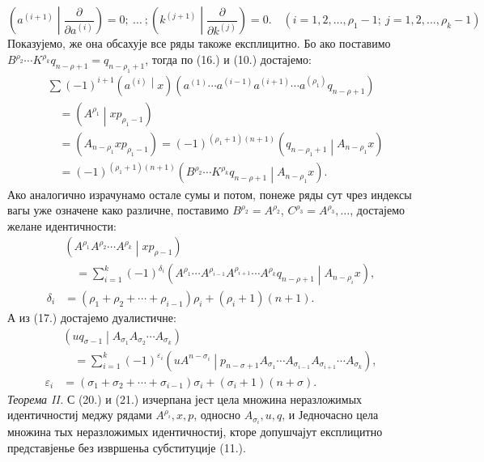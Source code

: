﻿\documentclass[11pt]{article}
\newcommand{\pair}[2]{\left(#1\middle|#2\right)}
\newcommand{\eps}{\varepsilon}
\begin{document}
\begin{equation}
 \left(a^{(i+1)}\middle|\frac{\partial}{\partial a^{(i)}}\right)=0;\ \ldots\ ;
 \left(k^{(j+1)}\middle|\frac{\partial}{\partial k^{(j)}}\right)=0.
 \quad (i=1,2,\ldots,\rho_1-1;\ j=1,2,\ldots,\rho_k-1)
\tag{19}
\end{equation}
Показујемо, же она обсахује все ряды такоже експлицитно. Бо ако поставимо $B^{\rho_2}\cdots K^{\rho_k}q_{n-\rho+1}=q_{n-\rho_1+1}$, тогда по (16.) и (10.) достајемо:
\[
\begin{aligned}
&\sum(-1)^{i+1}\pair{a^{(i)}}{x}
(a^{(1)}\cdots a^{(i-1)}a^{(i+1)}\cdots a^{(\rho_1)}q_{n-\rho+1})\\
&\quad=\pair{A^{\rho_1}}{xp_{\rho_1-1}}\\
&\quad=(A_{n-\rho_1}xp_{\rho_1-1})
=(-1)^{(\rho_1+1)(n+1)}\pair{q_{n-\rho_1+1}}{A_{n-\rho_1}x}\\
&\quad=(-1)^{(\rho_1+1)(n+1)}
\pair{B^{\rho_2}\cdots K^{\rho_k}q_{n-\rho+1}}{A_{n-\rho_1}x}.
\end{aligned}
\]
Ако аналогично израчунамо остале сумы и потом, понеже ряды сут чрез индексы вагы уже означене како различне, поставимо $B^{\rho_2}=A^{\rho_2}$, $C^{\rho_3}=A^{\rho_3},\ldots$, достајемо желане идентичности:
\begin{equation}
\begin{aligned}
&\pair{A^{\rho_1}A^{\rho_2}\cdots A^{\rho_k}}{xp_{\rho-1}}\\
&\quad=\sum_{i=1}^{k}(-1)^{\delta_i}
\pair{A^{\rho_1}\cdots A^{\rho_{i-1}}A^{\rho_{i+1}}\cdots A^{\rho_k}q_{n-\rho+1}}{A_{n-\rho_i}x},\\
\delta_i&=(\rho_1+\rho_2+\cdots+\rho_{i-1})\rho_i+(\rho_i+1)(n+1).
\end{aligned}
\tag{20}
\end{equation}
А из (17.) достајемо дуалистичне:
\begin{equation}
\begin{aligned}
&\pair{u q_{\sigma-1}}{A_{\sigma_1}A_{\sigma_2}\cdots A_{\sigma_k}}\\
&\quad=\sum_{i=1}^{k}(-1)^{\eps_i}
\pair{u A^{n-\sigma_i}}{p_{n-\sigma+1}A_{\sigma_1}\cdots A_{\sigma_{i-1}}A_{\sigma_{i+1}}\cdots A_{\sigma_k}},\\
\eps_i&=(\sigma_1+\sigma_2+\cdots+\sigma_{i-1})\sigma_i+(\sigma_i+1)(n+\sigma).
\end{aligned}
\tag{21}
\end{equation}
\emph{Теорема II.} С (20.) и (21.) изчерпана јест цела множина неразложимых идентичностиј меджу рядами $A^{\rho_i},x,p$, односно $A_{\sigma_i},u,q$, и Једночасно цела множина тых неразложимых идентичностиј, кторе допушчајут експлицитно представјенье без извршеньа субституције (11.).
\end{document}
